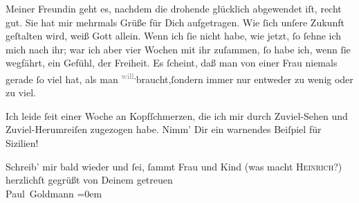 \pstart
           Meiner Freundin geht es,
               nachdem \strikeout{\textcolor{gray}{d}} die drohende \label{K_L03442-5v}\label{K_L03442-5}{ } glücklich abgewendet iſt, recht gut. Sie hat mir
                   mehrmals Grüße für Dich aufgetragen. Wie{ }ſich unſere Zukunft geſtalten wird, weiß Gott allein. Wenn {\pb} ich ſie nicht habe,
               wie jetzt,{ }ſo{ }ſehne ich mich nach ihr; war ich aber vier Wochen mit ihr zuſammen,{ }ſo
               habe ich, wenn{ }ſie wegfährt, ein Gefühl,  der Freiheit. Es{ }ſcheint, daß man von einer Frau niemals gerade{ }ſo viel hat,
               als man \substVorne{}\textsuperscript{\textcolor{gray}{will},}\substDazwischen{}braucht,\substHinten{}{ }ſondern immer nur entweder zu wenig oder zu viel.\pend
           
\pstart
           Ich leide{ }ſeit einer Woche an Kopfſchmerzen, die ich mir durch Zuviel-Sehen und
               Zuviel-Herumreiſen zugezogen habe. Nimm’ Dir ein warnendes Beiſpiel für Sizilien!\pend
           
\pstart
           Schreib’ mir bald wieder und{ }ſei,{ }ſammt Frau und Kind (was macht \textsc{Heinrich}?) herzlichſt gegrüßt von Deinem getreuen {\\[\baselineskip]}\spacefill\mbox{Paul Goldmann}\pend
           \leftskip=0em{}\endnumbering{}  \newcommand{\dateiname}{L03442}\newcommand{\titel}{Paul Goldmann an Arthur Schnitzler, 8. 4. [1904]}\newcommand{\editorInnen}{Martin Anton Müller und Laura Untner}
